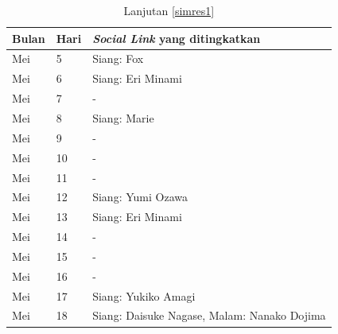 \begin{table}[H]
    \caption{\label{simres2}Lanjutan \autoref{simres1}}
    \begin{center}
        \begin{tabular}{ | p{} | p{} | p{} |}
            \hline
            \textbf{Bulan} & \textbf{Hari} & \textbf{\textit{Social Link} yang ditingkatkan} \\
            \hline
            Mei            & 5             & Siang: Fox                                      \\
            \hline
            Mei            & 6             & Siang: Eri Minami                               \\
            \hline
            Mei            & 7             & -                                               \\
            \hline
            Mei            & 8             & Siang: Marie                                    \\
            \hline
            Mei            & 9             & -                                               \\
            \hline
            Mei            & 10            & -                                               \\
            \hline
            Mei            & 11            & -                                               \\
            \hline
            Mei            & 12            & Siang: Yumi Ozawa                               \\
            \hline
            Mei            & 13            & Siang: Eri Minami                               \\
            \hline
            Mei            & 14            & -                                               \\
            \hline
            Mei            & 15            & -                                               \\
            \hline
            Mei            & 16            & -                                               \\
            \hline
            Mei            & 17            & Siang: Yukiko Amagi                             \\
            \hline
            Mei            & 18            & Siang: Daisuke Nagase, Malam: Nanako Dojima     \\

\end{tabular}
\end{center}
\end{table}
